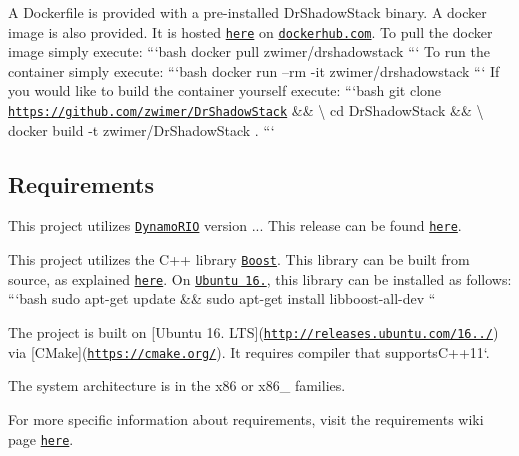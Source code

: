 A {\ttfamily Dockerfile} is provided with a pre-\/installed {\ttfamily Dr\-Shadow\-Stack} binary. A docker image is also provided. It is hosted \href{https://cloud.docker.com/u/zwimer/repository/docker/zwimer/drshadowstack}{\tt here} on \href{dockerhub.com}{\tt dockerhub.\-com}. To pull the docker image simply execute\-: ```bash docker pull zwimer/drshadowstack ``` To run the container simply execute\-: ```bash docker run --rm -\/it zwimer/drshadowstack ``` If you would like to build the container yourself execute\-: ```bash git clone \href{https://github.com/zwimer/DrShadowStack}{\tt https\-://github.\-com/zwimer/\-Dr\-Shadow\-Stack} \&\& \textbackslash{} cd Dr\-Shadow\-Stack \&\& \textbackslash{} docker build -\/t zwimer/\-Dr\-Shadow\-Stack . ```

\subsection*{Requirements}


\begin{DoxyEnumerate}
\item This project utilizes \href{https://github.com/DynamoRIO/dynamorio}{\tt Dynamo\-R\-I\-O} version {..}. This release can be found \href{https://github.com/DynamoRIO/dynamorio/releases/download/cronbuild-7.0.17636/DynamoRIO-x86_64-Linux-7.0.17636-0.tar.gz}{\tt here}.
\item This project utilizes the C++ library \href{https://boost.org}{\tt Boost}. This library can be built from source, as explained \href{https://www.boost.org/doc/libs/1_66_0/more/getting_started/unix-variants.html}{\tt here}. On \href{http://releases.ubuntu.com/16.04.4/}{\tt Ubuntu 16.}, this library can be installed as follows\-: ```bash sudo apt-\/get update \&\& sudo apt-\/get install libboost-\/all-\/dev ``{\ttfamily }
\item {\ttfamily The project is built on \mbox{[}Ubuntu 16. L\-T\-S\mbox{]}(\href{http://releases.ubuntu.com/16.04.4/}{\tt http\-://releases.\-ubuntu.\-com/16../}) via \mbox{[}C\-Make\mbox{]}(\href{https://cmake.org/}{\tt https\-://cmake.\-org/}). It requires compiler that supports}C++11`.
\item The system architecture is in the x86 or x86\-\_ families.
\end{DoxyEnumerate}

For more specific information about requirements, visit the requirements wiki page \href{https://github.com/zwimer/DrShadowStack/wiki/Requirements}{\tt here}.

